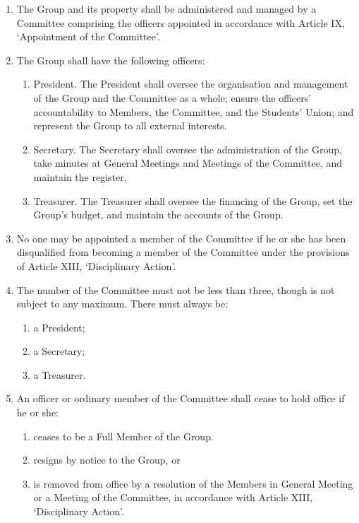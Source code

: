 \documentclass[12pt]{constitution}
\begin{document}
\begin{enumerate}
    \item The Group and its property shall be administered and managed by a Committee comprising the officers appointed in accordance with Article IX, `Appointment of the Committee'.
    \item The Group shall have the following officers:
    \begin{enumerate}
        \item President. The President shall oversee the organisation and management of the Group and the Committee as a whole; ensure the officers' accountability to Members, the Committee, and the Students' Union; and represent the Group to all external interests.
        \item Secretary. The Secretary shall oversee the administration of the Group, take minutes at General Meetings and Meetings of the Committee, and maintain the register.
        \item Treasurer. The Treasurer shall oversee the financing of the Group, set the Group's budget, and maintain the accounts of the Group.
    \end{enumerate}

\item No one may be appointed a member of the Committee if he or she has been disqualified from becoming a member of the Committee under the provisions of Article XIII, `Disciplinary Action'.
    \item The number of the Committee must not be less than three, though is not subject to any maximum. There must always be:
    \begin{enumerate}
        \item a President;
        \item a Secretary;
        \item a Treasurer.
    \end{enumerate}

    \item An officer or ordinary member of the Committee shall cease to hold office if he or she:
    \begin{enumerate}
        \item ceases to be a Full Member of the Group.
        \item resigns by notice to the Group, or
        \item is removed from office by a resolution of the Members in General Meeting or a Meeting of the Committee, in accordance with Article XIII, `Disciplinary Action'.
    \end{enumerate}
\end{enumerate}
\end{document}
